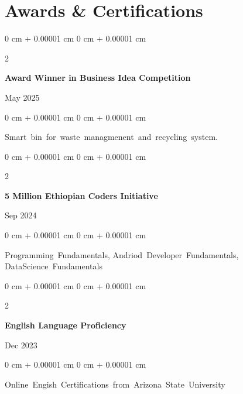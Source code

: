 \documentclass[10pt, letterpaper]{article}
\newenvironment{onecolentry}{
    \begin{adjustwidth}{
        0 cm + 0.00001 cm
    }{
        0 cm + 0.00001 cm
    }
}{
    \end{adjustwidth}
} %
\newenvironment{twocolentry}[2][]{
    \onecolentry
    \def\secondColumn{#2}
    \setcolumnwidth{\fill, 4.5 cm}
    \begin{paracol}{2}
}{
    \switchcolumn \raggedleft \secondColumn
    \end{paracol}
    \endonecolentry
} %
\begin{document}
    
    \section{Awards \& Certifications}
        
        \begin{samepage}
              \begin{twocolentry}{
                May 2025
            }
                \textbf{Award Winner in Business Idea Competition}
            \end{twocolentry}

            \vspace{0.10 cm}
            
           \begin{onecolentry}
               \mbox{Smart bin for waste managmenent and recycling system.}

                \vspace{0.20 cm}
                
        \end{onecolentry}

          \begin{twocolentry}{
                Sep 2024
            }
                \textbf{5 Million Ethiopian Coders Initiative}
            \end{twocolentry}

            \vspace{0.10 cm}
            
            \begin{onecolentry}
                \mbox{Programming Fundamentals}, \mbox{Andriod Developer Fundamentals}, \mbox{DataScience Fundamentals}

                \vspace{0.20 cm}
                
        \end{onecolentry}

            \begin{twocolentry}{
                Dec 2023
            }
                \textbf{English Language Proficiency}
            \end{twocolentry}

            \vspace{0.10 cm}
            
            \begin{onecolentry}
                \mbox{Online Engish Certifications from Arizona State University }

                \vspace{0.10 cm}
                
        \end{onecolentry}
        \end{samepage}
\end{document}
